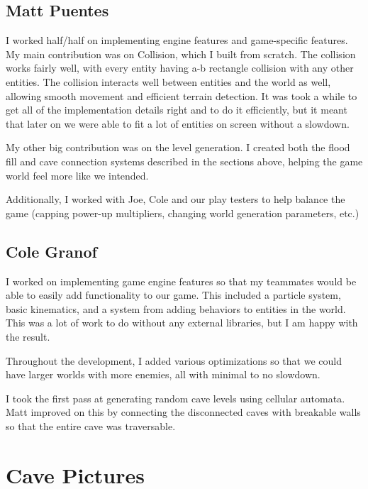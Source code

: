 \documentclass[a4paper, 12pt]{article}
\begin{document}
\subsection{Matt Puentes}

I worked half/half on implementing engine features and game-specific features.
My main contribution was on Collision, which I built from scratch. The collision
works fairly well, with every entity having a-b rectangle collision with any
other entities. The collision interacts well between entities and the world as
well, allowing smooth movement and efficient terrain detection. It was took a
while to get all of the implementation details right and to do it efficiently, 
but it meant that later on we were able to fit a lot of entities on screen
without a slowdown.

My other big contribution was on the level generation. I created both the
flood fill and cave connection systems described in the sections above, helping
the game world feel more like we intended.

Additionally, I worked with Joe, Cole and our play testers to help balance the
game (capping power-up multipliers, changing world generation parameters, etc.)

\subsection{Cole Granof}

I worked on implementing game engine features so that my teammates would be able
to easily add functionality to our game. This included a particle system, basic
kinematics, and a system from adding behaviors to entities in the world. This
was a lot of work to do without any external libraries, but I am happy with the
result.

Throughout the development, I added various optimizations so that we could have
larger worlds with more enemies, all with minimal to no slowdown.

I took the first pass at generating random cave levels using cellular automata.
Matt improved on this by connecting the disconnected caves with breakable walls
so that the entire cave was traversable.

\section{Cave Pictures}
\label{sec:cavePictures}
\end{document}
